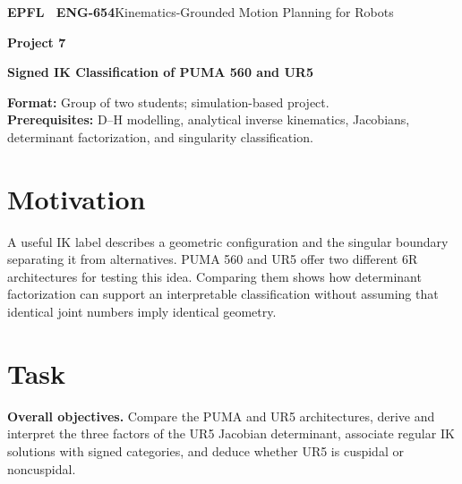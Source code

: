 \documentclass[11pt,a4paper]{article}
\begin{document}
{\small\textbf{EPFL \textbar\ ENG-654}\hfill Kinematics-Grounded Motion Planning for Robots}
\vspace{5mm}

{\color{epflred}\Large\bfseries Project 7}

{\LARGE\bfseries Signed IK Classification of PUMA 560 and UR5\par}

\textbf{Format:} Group of two students; simulation-based project.\\
\textbf{Prerequisites:} D--H modelling, analytical inverse kinematics,
Jacobians, determinant factorization, and singularity classification.

\section*{Motivation}
A useful IK label describes a geometric configuration and the singular
boundary separating it from alternatives. PUMA 560 and UR5 offer two different
6R architectures for testing this idea. Comparing them shows how determinant
factorization can support an interpretable classification without assuming
that identical joint numbers imply identical geometry.

\section*{Task}
\textbf{Overall objectives.} Compare the PUMA and UR5 architectures, derive and interpret the three
factors of the UR5 Jacobian determinant, associate regular IK solutions with
signed categories, and deduce whether UR5 is cuspidal or noncuspidal.
\end{document}
